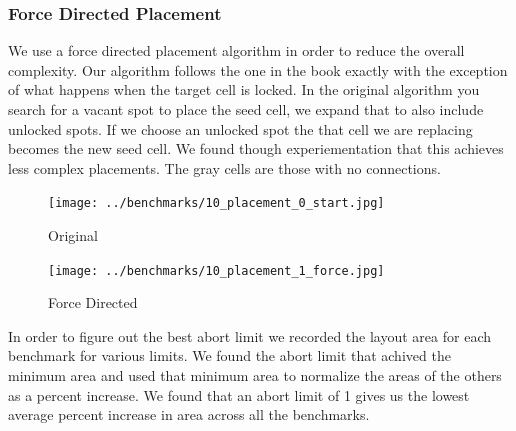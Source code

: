 \documentclass[10pt]{article}
\begin{document}
        \newpage
        \subsubsection{Force Directed Placement}

        We use a force directed placement algorithm in order to reduce the
        overall complexity. Our algorithm follows the one in the book exactly
        with the exception of what happens when the target cell is locked.  In
        the original algorithm you search for a vacant spot to place the seed
        cell, we expand that to also include unlocked spots. If we choose an
        unlocked spot the that cell we are replacing becomes the new seed cell.
        We found though experiementation that this achieves less complex
        placements. The gray cells are those with no connections.

        \begin{figure}[H]
            \centering
            \texttt{[image: ../benchmarks/10\_placement\_0\_start.jpg]}
            \caption{Original}
        \end{figure}
        \begin{figure}[H]
            \centering
            \texttt{[image: ../benchmarks/10\_placement\_1\_force.jpg]}
            \caption{Force Directed}
        \end{figure}

        In order to figure out the best abort limit we recorded the layout area
        for each benchmark for various limits. We found the abort limit that
        achived the minimum area and used that minimum area to normalize the
        areas of the others as a percent increase. We found that an abort limit
        of 1 gives us the lowest average percent increase in area across all
        the benchmarks.
\end{document}
